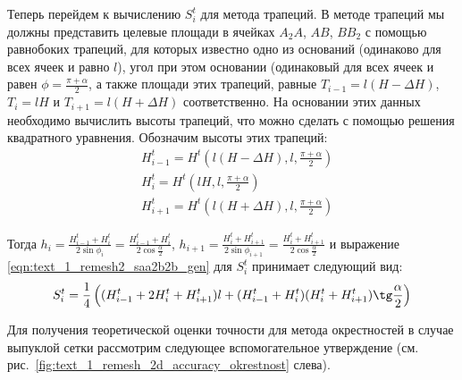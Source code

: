 \documentclass[
11pt,%
tightenlines,%
twoside,%
onecolumn,%
nofloats,%
nobibnotes,%
nofootinbib,%
superscriptaddress,%
noshowpacs,%
centertags]%
{revtex4}
\begin{document}
Теперь перейдем к вычислению $S_i^t$ для метода трапеций.
В методе трапеций мы должны представить целевые площади в ячейках $A_2A$, $AB$, $BB_2$ с помощью равнобоких трапеций, для которых известно одно из оснований (одинаково для всех ячеек и равно $l$), угол при этом основании (одинаковый для всех ячеек и равен $\phi = \frac{\pi + \alpha}{2}$, а также площади этих трапеций, равные $T_{i - 1} = l(H - \Delta H)$, $T_i = lH$ и $T_{i + 1} = l(H + \Delta H)$ соответственно.
На основании этих данных необходимо вычислить высоты трапеций, что можно сделать с помощью решения квадратного уравнения.
Обозначим высоты этих трапеций:
\begin{equation}
	\begin{aligned}\label{eqn:text_1_remesh_2_Ht_vypukl}
		& H_{i - 1}^t = H^t\left(l(H - \Delta H), l, \frac{\pi + \alpha}{2}\right) \\ 
		& H_i^t = H^t\left(lH, l, \frac{\pi + \alpha}{2}\right) \\
		& H_{i + 1}^t = H^t\left(l(H + \Delta H), l, \frac{\pi + \alpha}{2}\right)
	\end{aligned}
\end{equation}

Тогда $h_i = \frac{H_{i - 1}^t + H_i^t}{2 \sin \phi_i} = \frac{H_{i - 1}^t + H_i^t}{2 \cos \frac{\alpha}{2}}$, $h_{i+1} = \frac{H_i^t + H_{i+1}^t}{2 \sin \phi_{i + 1}} = \frac{H_i^t + H_{i+1}^t}{2 \cos \frac{\alpha}{2}}$ и выражение \eqref{eqn:text_1_remesh2_saa2b2b_gen} для $S_i^t$ принимает следующий вид:
\begin{equation}\label{eqn:text_1_remesh2_trap}
	S_i^t = \frac{1}{4} \left( (H_{i - 1}^t + 2 H_i^t + H_{i + 1}^t)l + (H_{i - 1}^t + H_i^t) (H_i^t + H_{i+1}^t) \tg \frac{\alpha}{2} \right)
\end{equation}

Для получения теоретической оценки точности для метода окрестностей в случае выпуклой сетки рассмотрим следующее вспомогательное утверждение (см. рис.~\ref{fig:text_1_remesh_2d_accuracy_okrestnost} слева).
\end{document}
